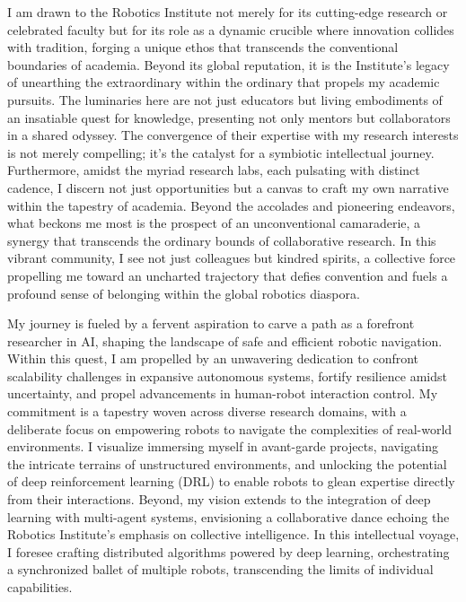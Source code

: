 \documentclass[a4,20pt]{article}
\begin{document}
\begin{large}
I am drawn to the Robotics Institute not merely for its cutting-edge research or celebrated faculty but for its role as a dynamic crucible where innovation collides with tradition, forging a unique ethos that transcends the conventional boundaries of academia. Beyond its global reputation, it is the Institute's legacy of unearthing the extraordinary within the ordinary that propels my academic pursuits. The luminaries here are not just educators but living embodiments of an insatiable quest for knowledge, presenting not only mentors but collaborators in a shared odyssey. The convergence of their expertise with my research interests is not merely compelling; it's the catalyst for a symbiotic intellectual journey. Furthermore, amidst the myriad research labs, each pulsating with distinct cadence, I discern not just opportunities but a canvas to craft my own narrative within the tapestry of academia. Beyond the accolades and pioneering endeavors, what beckons me most is the prospect of an unconventional camaraderie, a synergy that transcends the ordinary bounds of collaborative research. In this vibrant community, I see not just colleagues but kindred spirits, a collective force propelling me toward an uncharted trajectory that defies convention and fuels a profound sense of belonging within the global robotics diaspora.


My journey is fueled by a fervent aspiration to carve a path as a forefront researcher in AI, shaping the landscape of safe and efficient robotic navigation. Within this quest, I am propelled by an unwavering dedication to confront scalability challenges in expansive autonomous systems, fortify resilience amidst uncertainty, and propel advancements in human-robot interaction control. My commitment is a tapestry woven across diverse research domains, with a deliberate focus on empowering robots to navigate the complexities of real-world environments. I visualize immersing myself in avant-garde projects, navigating the intricate terrains of unstructured environments, and unlocking the potential of deep reinforcement learning (DRL) to enable robots to glean expertise directly from their interactions. Beyond, my vision extends to the integration of deep learning with multi-agent systems, envisioning a collaborative dance echoing the Robotics Institute's emphasis on collective intelligence. In this intellectual voyage, I foresee crafting distributed algorithms powered by deep learning, orchestrating a synchronized ballet of multiple robots, transcending the limits of individual capabilities.





\end{large}
\end{document}
